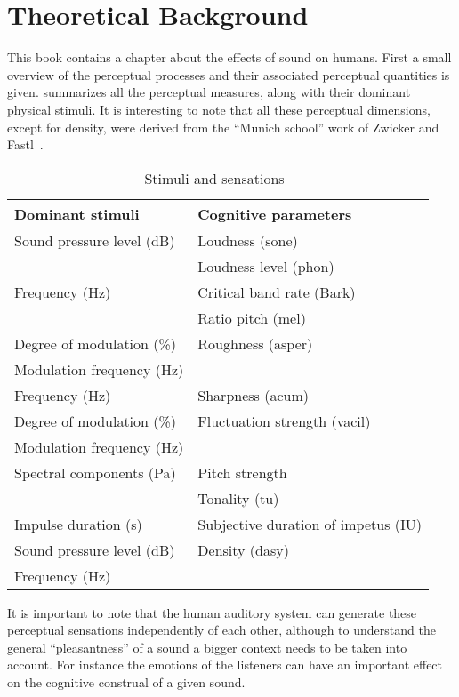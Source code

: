 \documentclass[../main.tex]{subfiles}
\begin{document}
\chapter{Theoretical Background}

This book contains a chapter about the effects of sound on humans. First a small
overview of the perceptual processes and their associated perceptual quantities
is given.  summarizes all the perceptual measures, along
with their dominant physical stimuli. It is interesting to note that all these
perceptual dimensions, except for density, were derived from the
``Munich school'' work of Zwicker and Fastl~\cite{Fastl2007Psychoacoustics}.

\begin{table}[ht]
  \centering
  \begin{tabular}{ l l }
    \toprule
    Dominant stimuli & Cognitive parameters \\
    \midrule
    Sound pressure level (dB) & Loudness (sone) \\
    \cmidrule{2-2}
    & Loudness level (phon) \\
    \midrule
    Frequency (Hz) & Critical band rate (Bark) \\
    \cmidrule{2-2}
    & Ratio pitch (mel) \\
    \midrule
    Degree of modulation (\%) & Roughness (asper)\\
    \cmidrule{1-1}
    Modulation frequency (Hz) & \\
    \midrule
    Frequency (Hz) & Sharpness (acum) \\
    \midrule
    Degree of modulation (\%) & Fluctuation strength (vacil) \\
    \cmidrule{1-1}
    Modulation frequency (Hz) & \\
    \midrule
    Spectral components (Pa) & Pitch strength \\
    \cmidrule{2-2}
    & Tonality (tu) \\
    \midrule
    Impulse duration (s) & Subjective duration of impetus (IU) \\
    \midrule
    Sound pressure level (dB) & Density (dasy) \\
    Frequency (Hz) & \\
    \bottomrule
  \end{tabular}
  \caption{Stimuli and sensations~\cite[pp.~70]{Mueller2012Handbook}}
  \label{tab:stimsens}
\end{table}

It is important to note that the human auditory system can generate these
perceptual sensations independently of each other, although to understand the
general ``pleasantness'' of a sound a bigger context needs to be taken into
account. For instance the emotions of the listeners can have an important
effect on the cognitive construal of a given sound.
\end{document}
